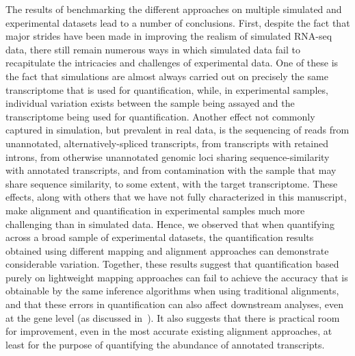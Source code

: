 The results of benchmarking the different approaches on multiple simulated and
experimental datasets lead to a number of conclusions. First, despite the fact
that major strides have been made in improving the realism of simulated RNA-seq
data, there still remain numerous ways in which simulated data fail to
recapitulate the intricacies and challenges of experimental data. One of these
is the fact that simulations are almost always carried out on precisely the same
transcriptome that is used for quantification, while, in experimental samples,
individual variation exists between the sample being assayed and the
transcriptome being used for quantification. Another effect not
  commonly captured in simulation, but prevalent in real data, is the sequencing
  of reads from unannotated, alternatively-spliced transcripts, from transcripts
  with retained introns, from otherwise unannotated genomic loci sharing
  sequence-similarity with annotated transcripts, and from contamination with the 
  sample that may share sequence similarity, to some extent, with the target transcriptome. 
  These effects, along with others that we have not fully characterized in this manuscript, make alignment
  and quantification in experimental samples much more challenging than in
  simulated data. Hence, we observed that when quantifying across a broad sample
of experimental datasets, the quantification results obtained using different
mapping and alignment approaches can demonstrate considerable variation.
Together, these results suggest that quantification based purely on lightweight
mapping approaches can fail to achieve the accuracy that is obtainable by the
same inference algorithms when using traditional alignments, and that these
errors in quantification can also affect downstream analyses, even at the gene
level (as discussed in~). It also suggests that there is practical
room for improvement, even in the most accurate existing alignment approaches, at least
for the purpose of quantifying the abundance of annotated transcripts.

